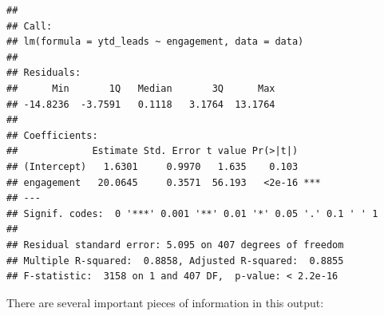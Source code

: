 \documentclass[
]{book}
\begin{document}
\begin{verbatim}
## 
## Call:
## lm(formula = ytd_leads ~ engagement, data = data)
## 
## Residuals:
##      Min       1Q   Median       3Q      Max 
## -14.8236  -3.7591   0.1118   3.1764  13.1764 
## 
## Coefficients:
##             Estimate Std. Error t value Pr(>|t|)    
## (Intercept)   1.6301     0.9970   1.635    0.103    
## engagement   20.0645     0.3571  56.193   <2e-16 ***
## ---
## Signif. codes:  0 '***' 0.001 '**' 0.01 '*' 0.05 '.' 0.1 ' ' 1
## 
## Residual standard error: 5.095 on 407 degrees of freedom
## Multiple R-squared:  0.8858, Adjusted R-squared:  0.8855 
## F-statistic:  3158 on 1 and 407 DF,  p-value: < 2.2e-16
\end{verbatim}

There are several important pieces of information in this output:
\end{document}
